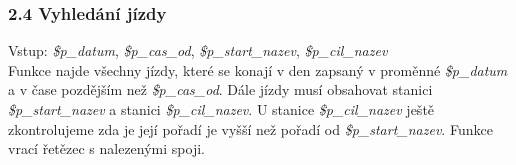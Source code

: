\documentclass[11pt]{article}
\begin{document}

\subsubsection*{2.4 Vyhledání jízdy}
Vstup: \textit{\$p\_datum}, \textit{\$p\_cas\_od}, \textit{\$p\_start\_nazev}, \textit{\$p\_cil\_nazev}\\
Funkce najde všechny jízdy, které se konají v den zapsaný v proměnné \textit{\$p\_datum} a v čase pozdějším než \textit{\$p\_cas\_od}. Dále jízdy musí obsahovat stanici \textit{\$p\_start\_nazev} a stanici \textit{\$p\_cil\_nazev}. U stanice \textit{\$p\_cil\_nazev} ještě zkontrolujeme zda je její pořadí je vyšší než pořadí od \textit{\$p\_start\_nazev}. Funkce vrací řetězec s nalezenými spoji.
\end{document}
